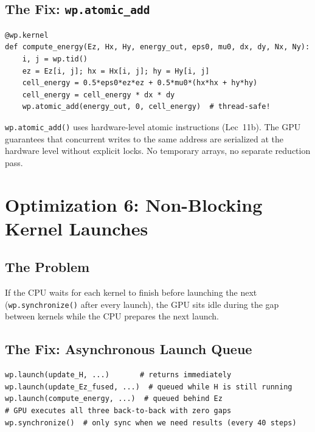 \documentclass[11pt,a4paper]{article}
\begin{document}
\subsection{The Fix: \texttt{wp.atomic\_add}}

\begin{lstlisting}[caption={Energy computation via atomic reduction}]
@wp.kernel
def compute_energy(Ez, Hx, Hy, energy_out, eps0, mu0, dx, dy, Nx, Ny):
    i, j = wp.tid()
    ez = Ez[i, j]; hx = Hx[i, j]; hy = Hy[i, j]
    cell_energy = 0.5*eps0*ez*ez + 0.5*mu0*(hx*hx + hy*hy)
    cell_energy = cell_energy * dx * dy
    wp.atomic_add(energy_out, 0, cell_energy)  # thread-safe!
\end{lstlisting}

\begin{tcolorbox}[colback=green!3, colframe=okgreen, title=\textbf{Fix \#5: Atomic operations}]
\texttt{wp.atomic\_add()} uses hardware-level atomic instructions (Lec~11b). The GPU guarantees that concurrent writes to the same address are serialized at the hardware level without explicit locks. No temporary arrays, no separate reduction pass.
\end{tcolorbox}


\section{Optimization 6: Non-Blocking Kernel Launches}

\subsection{The Problem}

\begin{tcolorbox}[colback=red!3, colframe=warnred, title=\textbf{Bottleneck \#6: CPU waiting for GPU}]
If the CPU waits for each kernel to finish before launching the next (\texttt{wp.synchronize()} after every launch), the GPU sits idle during the gap between kernels while the CPU prepares the next launch.
\end{tcolorbox}

\subsection{The Fix: Asynchronous Launch Queue}

\begin{lstlisting}[caption={Non-blocking launches --- GPU stays busy}]
wp.launch(update_H, ...)       # returns immediately
wp.launch(update_Ez_fused, ...)  # queued while H is still running
wp.launch(compute_energy, ...)  # queued behind Ez
# GPU executes all three back-to-back with zero gaps
wp.synchronize()  # only sync when we need results (every 40 steps)
\end{lstlisting}
\end{document}
